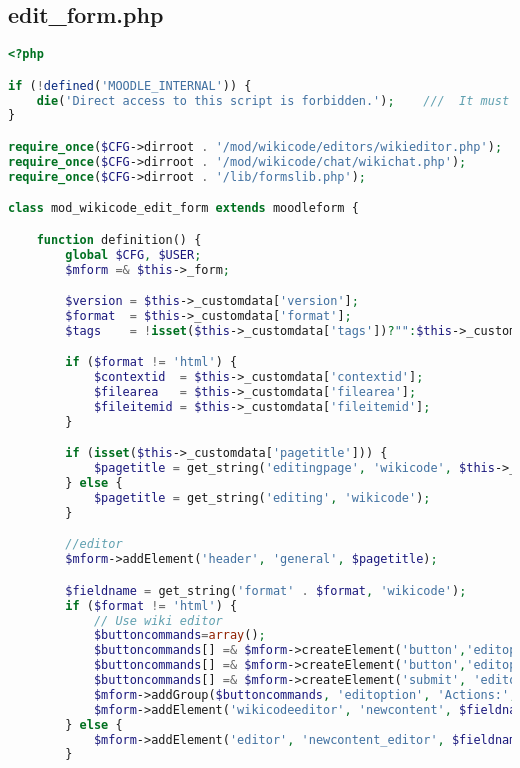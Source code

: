 \subsection{edit\_form.php}
\begin{lstlisting}[language=PHP]
<?php

if (!defined('MOODLE_INTERNAL')) {
    die('Direct access to this script is forbidden.');    ///  It must be included from a Moodle page
}

require_once($CFG->dirroot . '/mod/wikicode/editors/wikieditor.php');
require_once($CFG->dirroot . '/mod/wikicode/chat/wikichat.php');
require_once($CFG->dirroot . '/lib/formslib.php');

class mod_wikicode_edit_form extends moodleform {

    function definition() {
		global $CFG, $USER;
        $mform =& $this->_form;

        $version = $this->_customdata['version'];
        $format  = $this->_customdata['format'];
        $tags    = !isset($this->_customdata['tags'])?"":$this->_customdata['tags'];

        if ($format != 'html') {
            $contextid  = $this->_customdata['contextid'];
            $filearea   = $this->_customdata['filearea'];
            $fileitemid = $this->_customdata['fileitemid'];
        }

        if (isset($this->_customdata['pagetitle'])) {
            $pagetitle = get_string('editingpage', 'wikicode', $this->_customdata['pagetitle']);
        } else {
            $pagetitle = get_string('editing', 'wikicode');
        }

        //editor
        $mform->addElement('header', 'general', $pagetitle);

        $fieldname = get_string('format' . $format, 'wikicode');
        if ($format != 'html') {
            // Use wiki editor
			$buttoncommands=array();
			$buttoncommands[] =& $mform->createElement('button','editoption','Unlock', array('id' => 'btnunlock', 'class' => 'btnunlock'));
			$buttoncommands[] =& $mform->createElement('button','editoption','Refresh', array('id' => 'btnref', 'class' => 'btnref'));
			$buttoncommands[] =& $mform->createElement('submit', 'editoption', 'Save', array('id' => 'save'));
			$mform->addGroup($buttoncommands, 'editoption', 'Actions:', '', true);
            $mform->addElement('wikicodeeditor', 'newcontent', $fieldname, array('cols' => 150, 'rows' => 30, 'Wiki_format' => $format, 'files'=>$files));
        } else {
            $mform->addElement('editor', 'newcontent_editor', $fieldname, null, page_wikicode_edit::$attachmentoptions);
        }
		

\end{lstlisting}
